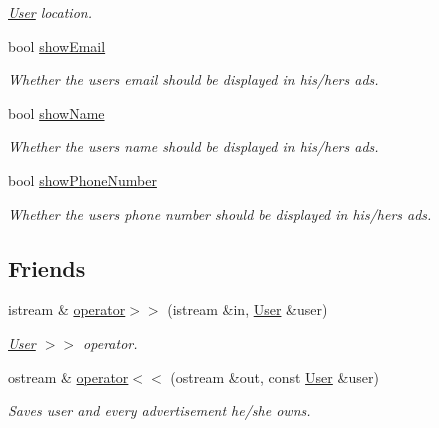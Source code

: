 \begin{DoxyCompactItemize}
\begin{DoxyCompactList}\small\item\em \hyperlink{class_user}{User} location. \end{DoxyCompactList}\item 
\hypertarget{class_user_a82dcde625983882667723c4549156db8}{}bool \hyperlink{class_user_a82dcde625983882667723c4549156db8}{show\+Email}\label{class_user_a82dcde625983882667723c4549156db8}

\begin{DoxyCompactList}\small\item\em Whether the user\textquotesingle{}s email should be displayed in his/hers ads. \end{DoxyCompactList}\item 
\hypertarget{class_user_a0360d5ecb5643df7899cef2c1479bd30}{}bool \hyperlink{class_user_a0360d5ecb5643df7899cef2c1479bd30}{show\+Name}\label{class_user_a0360d5ecb5643df7899cef2c1479bd30}

\begin{DoxyCompactList}\small\item\em Whether the user\textquotesingle{}s name should be displayed in his/hers ads. \end{DoxyCompactList}\item 
\hypertarget{class_user_af166bac19b9b0b9b85d1b51aaff9cbd9}{}bool \hyperlink{class_user_af166bac19b9b0b9b85d1b51aaff9cbd9}{show\+Phone\+Number}\label{class_user_af166bac19b9b0b9b85d1b51aaff9cbd9}

\begin{DoxyCompactList}\small\item\em Whether the user\textquotesingle{}s phone number should be displayed in his/hers ads. \end{DoxyCompactList}\end{DoxyCompactItemize}
\subsection*{Friends}
\begin{DoxyCompactItemize}
\item 
istream \& \hyperlink{class_user_aae624f64cdd1af3b59c2443cffa82494}{operator$>$$>$} (istream \&in, \hyperlink{class_user}{User} \&user)
\begin{DoxyCompactList}\small\item\em \hyperlink{class_user}{User} $>$$>$ operator. \end{DoxyCompactList}\item 
ostream \& \hyperlink{class_user_acf1038a8d320684dc3fbdd5e4308e062}{operator$<$$<$} (ostream \&out, const \hyperlink{class_user}{User} \&user)
\begin{DoxyCompactList}\small\item\em Saves user and every advertisement he/she owns. \end{DoxyCompactList}\end{DoxyCompactItemize}


